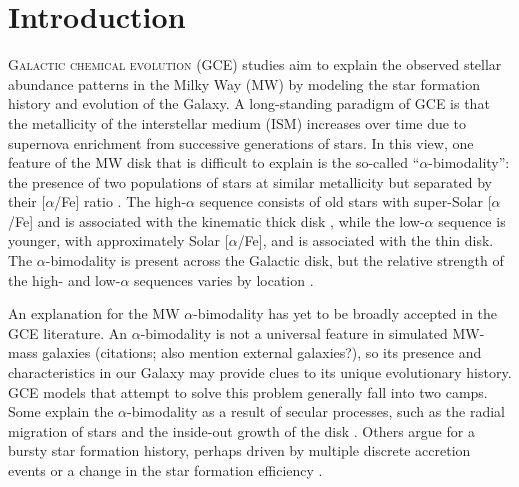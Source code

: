 \documentclass[twocolumn,twocolappendix,linenumbers]{aastex631}
\newcommand{\todo}[1]{{\color{red}#1}}
\newcommand{\aFe}{[$\alpha$/Fe]\xspace}
\begin{document}
% 

\section{Introduction}

\lettrine{G}{alactic chemical evolution} (GCE) studies aim to explain the observed stellar abundance patterns in the Milky Way (MW) by modeling the star formation history and evolution of the Galaxy. A long-standing paradigm of GCE is that the metallicity of the interstellar medium (ISM) increases over time due to supernova enrichment from successive generations of stars. In this view, one feature of the MW disk that is difficult to explain is the so-called ``$\alpha$-bimodality'': the presence of two populations of stars at similar metallicity but separated by their \aFe ratio \citep[e.g.,][]{bensby_exploring_2014}. The high-$\alpha$ sequence consists of old stars \citep[$\gtrsim9$ Gyr; e.g.,][]{pinsonneault_apokasc-3_2025} with super-Solar \aFe and is associated with the kinematic thick disk \citep[e.g.,][]{fuhrmann_nearby_1998}, while the low-$\alpha$ sequence is younger, with approximately Solar \aFe, and is associated with the thin disk. The $\alpha$-bimodality is present across the Galactic disk, but the relative strength of the high- and low-$\alpha$ sequences varies by location \citep{hayden_chemical_2015}. 

An explanation for the MW $\alpha$-bimodality has yet to be broadly accepted in the GCE literature. An $\alpha$-bimodality is not a universal feature in simulated MW-mass galaxies \todo{(citations; also mention external galaxies?)}, so its presence and characteristics in our Galaxy may provide clues to its unique evolutionary history. GCE models that attempt to solve this problem generally fall into two camps. Some explain the $\alpha$-bimodality as a result of secular processes, such as the radial migration of stars and the inside-out growth of the disk \citep[e.g.,][]{kubryk_evolution_2015,sharma_chemical_2021,chen_chemical_2023,prantzos_origin_2023}. Others argue for a bursty star formation history, perhaps driven by multiple discrete accretion events \citep[e.g.,][]{chiappini_chemical_1997,mackereth_origin_2018,spitoni_beyond_2023} or a change in the star formation efficiency \citep[e.g.][]{conroy_birth_2022}.
\end{document}

